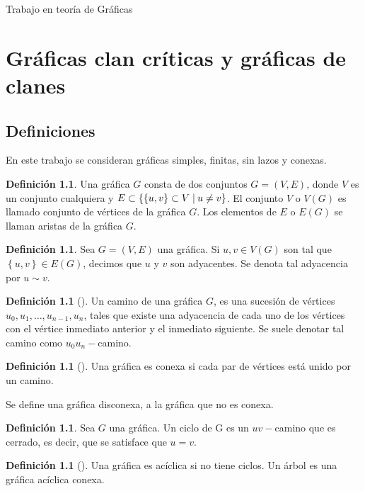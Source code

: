 \documentclass[12pt]{book}
\theoremstyle{definition}
\newtheorem{definition}[theorem]{Definición}
\newcommand{\set}[2]{\{#1\nonscript\;\vert\allowbreak\nonscript\:\mathopen{}#2\}}
\begin{document}
\begin{titlepage}

	\vfill

	{\LARGE Trabajo en teoría de Gráficas}\\[2cm]

	\vfill
\end{titlepage}
\chapter{Gráficas clan críticas y gráficas de clanes}
\section{Definiciones}
En este trabajo se consideran gráficas simples, finitas, sin lazos y conexas.
\begin{definition}
Una gráfica $G$ consta de dos conjuntos $G=(V,E)$, donde $V$ es un conjunto cualquiera y $E\subset \set{\left\{u,v\right\}\subset V}{u\neq v}$. El conjunto $V$ o $V(G)$ es llamado conjunto de vértices de la gráfica $G$. Los elementos de $E$ o $E(G)$ se llaman aristas de la gráfica $G$.
\end{definition}

\begin{definition}
Sea $G=(V,E)$ una gráfica. Si $u,v\in V(G)$ son tal que $\left\{u,v\right\}\in E(G)$, decimos que $u$ y $v$ son adyacentes. Se denota tal adyacencia por $u\sim v$.
\end{definition}

\begin{definition}[\citealt{Harary:1969}]
Un camino de una gráfica $G$, es una sucesión de vértices $u_0,u_1,\dots,u_{n-1},u_n$, tales que existe una adyacencia de cada uno de los vértices con el vértice inmediato anterior y el inmediato siguiente. Se suele denotar tal camino como $u_0u_n-$camino.
\end{definition}

\begin{definition}[\citealt{Harary:1969}]
Una gráfica es conexa si cada par de vértices está unido por un camino.
\end{definition}
Se define una gráfica disconexa, a la gráfica que no es conexa.

\begin{definition}
Sea $G$ una gráfica. Un ciclo de G es un $uv-$camino que es cerrado, es decir, que se satisface que $u=v$.
\end{definition}

\begin{definition}[\citealt{Harary:1969}]
Una gráfica es acíclica si no tiene ciclos. Un árbol es una gráfica acíclica conexa. 
\end{definition}
\end{document}
